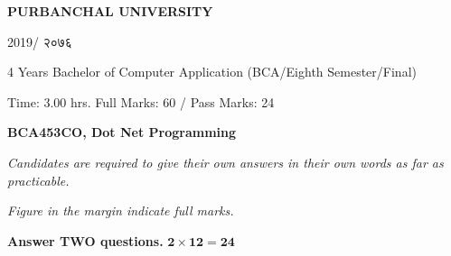 \documentclass[a4paper, twoside, 12pt, noanswers]{exam}
\newcommand{\textnp}{\texthindi}
\begin{document}

\begin{framed}
	\raggedright{\bfseries\Large\centering PURBANCHAL UNIVERSITY \par {2019/ \textnp{२०७६}}\par}
	{ 4 Years Bachelor of Computer Application (BCA/Eighth Semester/Final)\par}
	{ Time: 3.00 hrs.  \hfill Full Marks: 60 / Pass Marks: 24\par}
	{\bfseries {BCA453CO, Dot Net Programming \hfill}\par}
\end{framed}

{\noindent \it{Candidates are required to give their own answers in their own words as far as practicable.  }\par}
{\noindent \it{Figure in the margin indicate full marks.}\par}

{}
{\hspace*{-0.5cm} \bfseries Answer TWO questions.} \hfill {\( \mathbf{2\times 12 =24}\)}
\end{document}
